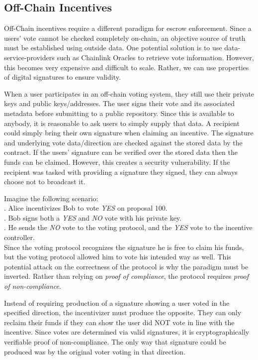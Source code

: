 \documentclass{article}
\begin{document}
\subsection{Off-Chain Incentives}

Off-Chain incentives require a different paradigm for escrow enforcement. Since a users' vote cannot be checked completely on-chain, an objective source of truth must be established using outside data. One potential solution is to use data-service-providers such as Chainlink Oracles to retrieve vote information. However, this becomes very expensive and difficult to scale. Rather, we can use properties of digital signatures to ensure validity. 

When a user participates in an off-chain voting system, they still use their private keys and public keys/addresses. The user signs their vote and its associated metadata before submitting to a public repository. Since this is available to anybody, it is reasonable to ask users to simply supply that data. A recipient could simply bring their own signature when claiming an incentive. The signature and underlying vote data/direction are checked against the stored data by the contract. If the users' signature can be verified over the stored data then the funds can be claimed. However, this creates a security vulnerability. If the recipient was tasked with providing a signature they signed, they can always choose not to broadcast it. 

Imagine the following scenario:\\
. Alice incentivizes Bob to vote \emph{YES} on proposal 100.\\
. Bob signs both a \emph{YES} and \emph{NO} vote with his private key.\\
. He sends the \emph{NO} vote to the voting protocol, and the \emph{YES} vote to the incentive controller.\\

Since the voting protocol recognizes the signature he is free to claim his funds, but the voting protocol allowed him to vote his intended way as well. This potential attack on the correctness of the protocol is why the paradigm must be inverted. Rather than relying on \emph{proof of compliance}, the protocol requires \emph{proof of non-compliance}. 

Instead of requiring production of a signature showing a user voted in the specified direction, the incentivizer must produce the opposite. They can only reclaim their funds if they can show the user did NOT vote in line with the incentive. Since votes are determined via valid signatures, it is cryptographically verifiable proof of non-compliance. The only way that signature could be produced was by the original voter voting in that direction.
\end{document}
